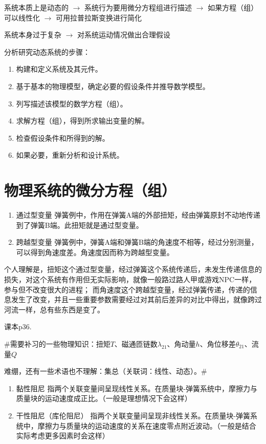 \documentclass{NHNotebook}
\begin{document}
系统本质上是动态的 $\rightarrow$ 系统行为要用微分方程组进行描述 $\rightarrow$ 如果方程（组）可以线性化 $\rightarrow$ 可用拉普拉斯变换进行简化

系统本身过于复杂 $\rightarrow$ 对系统运动情况做出合理假设

分析研究动态系统的步骤：
\begin{enumerate}
    \item 构建和定义系统及其元件。
    \item 基于基本的物理模型，确定必要的假设条件并推导数学模型。
    \item 列写描述该模型的数学方程（组）。
    \item 求解方程（组），得到所求输出变量的解。
    \item 检查假设条件和所得到的解。
    \item 如果必要，重新分析和设计系统。
\end{enumerate}

\section{物理系统的微分方程（组）}
\begin{enumerate}
    \item 通过型变量
    弹簧例中，作用在弹簧A端的外部扭矩，经由弹簧原封不动地传递到了弹簧B端。此扭矩就是通过型变量。
    \item 跨越型变量
    弹簧例中，弹簧A端和弹簧B端的角速度不相等，经过分别测量，可以得到角速度差。角速度因而称为跨越型变量。
\end{enumerate}

个人理解是，扭矩这个通过型变量，经过弹簧这个系统传递后，未发生传递信息的损失，对这个系统有作用但无实际影响，就像一般路过路人甲或游戏NPC一样，参与但不改变很大的进程；
而角速度这个跨越型变量，经过弹簧传递，传递的信息发生了改变，并且一些重要参数需要经过对其前后差异的对比中得出，就像跨过河流一样，总有些东西是变了。

课本p36.

\textcolor{blue!35}{\#需要补习的一些物理知识：扭矩$T$、磁通匝链数$\lambda_{21}$、角动量$h$、角位移差$\theta_{21}$、流量$Q$}

\textcolor{blue!35}{难绷，还有一些术语也不理解：集总（关联词：线性、动态）。\#}

\begin{enumerate}
    \item 黏性阻尼
    指两个关联变量间呈现线性关系。在质量块-弹簧系统中，摩擦力与质量块的运动速度成正比。（一般是理想情况下会这样）
    \item 干性阻尼（库伦阻尼）
    指两个关联变量间呈现非线性关系。在质量块-弹簧系统中，摩擦力与质量块的运动速度的关系在速度零点附近波动。（一般是结合实际考虑更多因素时会这样）
\end{enumerate}
\end{document}

